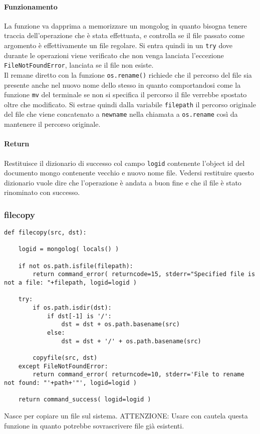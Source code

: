 \documentclass[11pt]{article}
\begin{document}
\paragraph{Funzionamento}
La funzione va dapprima a memorizzare un mongolog in quanto bisogna tenere traccia dell'operazione che è stata effettuata,
e controlla se il file passato come argomento è effettivamente un file regolare.
Si entra quindi in un \texttt{try} dove durante le operazioni viene verificato che non venga lanciata l'eccezione
\texttt{FileNotFoundError}, lanciata se il file non esiste.\\
Il remane diretto con la funzione \texttt{os.rename()} richiede che il percorso del file sia presente anche nel nuovo
nome dello stesso in quanto comportandosi come la funzione \texttt{mv} del terminale se non si specifica il percorso
il file verrebbe spostato oltre che modificato. Si estrae quindi dalla variabile \texttt{filepath} il percorso originale
del file che viene concatenato a \texttt{newname} nella chiamata a \texttt{os.rename} così da mantenere il percorso originale.
\paragraph{Return}
Restituisce il dizionario di successo col campo \texttt{logid} contenente l'object id del documento mongo contenente vecchio
e nuovo nome file. Vedersi restituire questo dizionario vuole dire che l'operazione è andata a buon fine e che il file
è stato rinominato con successo.

\subsubsection{filecopy}\label{filecopy}
\begin{lstlisting}
def filecopy(src, dst):

    logid = mongolog( locals() )

    if not os.path.isfile(filepath):
        return command_error( returncode=15, stderr="Specified file is not a file: "+filepath, logid=logid )

    try:
        if os.path.isdir(dst):
            if dst[-1] is '/':
                dst = dst + os.path.basename(src)
            else:
                dst = dst + '/' + os.path.basename(src)

        copyfile(src, dst)
    except FileNotFoundError:
        return command_error( returncode=10, stderr='File to rename not found: "'+path+'"', logid=logid )

    return command_success( logid=logid )
\end{lstlisting}
Nasce per copiare un file sul sistema. ATTENZIONE: Usare con cautela questa funzione in quanto potrebbe sovrascrivere file
già esistenti.
\end{document}
